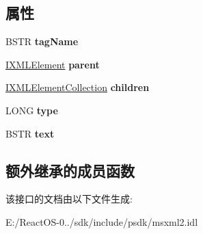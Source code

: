 \subsection*{属性}
\begin{DoxyCompactItemize}
\item 
\mbox{\label{interface_m_s_x_m_l2_1_1_i_x_m_l_element_a3f6da4ac4d8a9c8e2423b57f6a21d7be}} 
B\+S\+TR {\bfseries tag\+Name}
\item 
\mbox{\label{interface_m_s_x_m_l2_1_1_i_x_m_l_element_a94b98b9e8108e8c182976618c546f3a1}} 
\hyperlink{interface_m_s_x_m_l2_1_1_i_x_m_l_element}{I\+X\+M\+L\+Element} {\bfseries parent}
\item 
\mbox{\label{interface_m_s_x_m_l2_1_1_i_x_m_l_element_a77181e45c450e82836b00dddba8ff25f}} 
\hyperlink{interface_m_s_x_m_l2_1_1_i_x_m_l_element_collection}{I\+X\+M\+L\+Element\+Collection} {\bfseries children}
\item 
\mbox{\label{interface_m_s_x_m_l2_1_1_i_x_m_l_element_a3d3857ef24a6876ddeca68360f3b477e}} 
L\+O\+NG {\bfseries type}
\item 
\mbox{\label{interface_m_s_x_m_l2_1_1_i_x_m_l_element_a429edaa5aafc7ec805dbf93d486d5c69}} 
B\+S\+TR {\bfseries text}
\end{DoxyCompactItemize}
\subsection*{额外继承的成员函数}


该接口的文档由以下文件生成\+:\begin{DoxyCompactItemize}
\item 
E\+:/\+React\+O\+S-\/0../sdk/include/psdk/msxml2.\+idl\end{DoxyCompactItemize}
